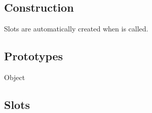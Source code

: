 \subsection{Construction}

Slots are automatically created when  is called.

\subsection{Prototypes}
\begin{refObjects}
\item[Object]
\end{refObjects}

\subsection{Slots}

